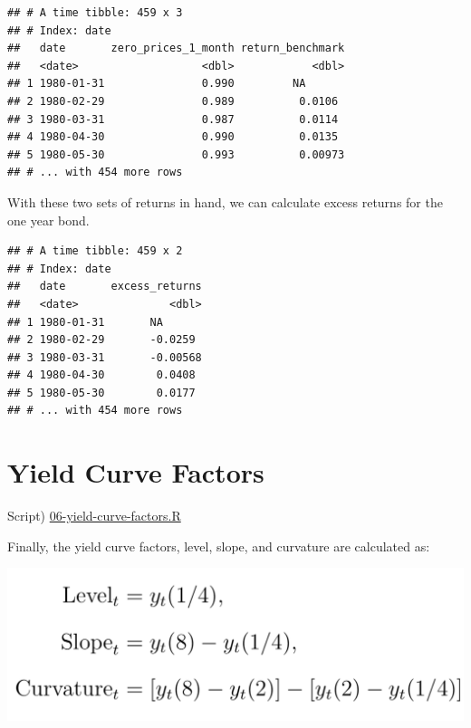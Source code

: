 \documentclass[]{book}
\newenvironment{Shaded}{\begin{snugshade}}{\end{snugshade}}
\newcommand{\DataTypeTok}[1]{\textcolor[rgb]{0.13,0.29,0.53}{#1}}
\newcommand{\KeywordTok}[1]{\textcolor[rgb]{0.13,0.29,0.53}{\textbf{#1}}}
\newcommand{\NormalTok}[1]{#1}
\newcommand{\OperatorTok}[1]{\textcolor[rgb]{0.81,0.36,0.00}{\textbf{#1}}}
\newcommand{\StringTok}[1]{\textcolor[rgb]{0.31,0.60,0.02}{#1}}
\theoremstyle{definition}
\theoremstyle{definition}
\theoremstyle{definition}
\theoremstyle{remark}
\begin{document}
\begin{verbatim}
## # A time tibble: 459 x 3
## # Index: date
##   date       zero_prices_1_month return_benchmark
##   <date>                   <dbl>            <dbl>
## 1 1980-01-31               0.990         NA      
## 2 1980-02-29               0.989          0.0106 
## 3 1980-03-31               0.987          0.0114 
## 4 1980-04-30               0.990          0.0135 
## 5 1980-05-30               0.993          0.00973
## # ... with 454 more rows
\end{verbatim}

With these two sets of returns in hand, we can calculate excess returns
for the one year bond.

\begin{Shaded}
\end{Shaded}

\begin{verbatim}
## # A time tibble: 459 x 2
## # Index: date
##   date       excess_returns
##   <date>              <dbl>
## 1 1980-01-31       NA      
## 2 1980-02-29       -0.0259 
## 3 1980-03-31       -0.00568
## 4 1980-04-30        0.0408 
## 5 1980-05-30        0.0177 
## # ... with 454 more rows
\end{verbatim}

\hypertarget{yield-curve-factors}{%
\section{Yield Curve Factors}\label{yield-curve-factors}}

Script) \href{./R/06-yield-curve-factors.R}{06-yield-curve-factors.R}

Finally, the yield curve factors, level, slope, and curvature are
calculated as:

\begin{center}\includegraphics[width=17.86in]{images/level-slope-curvature} \end{center}
\end{document}
